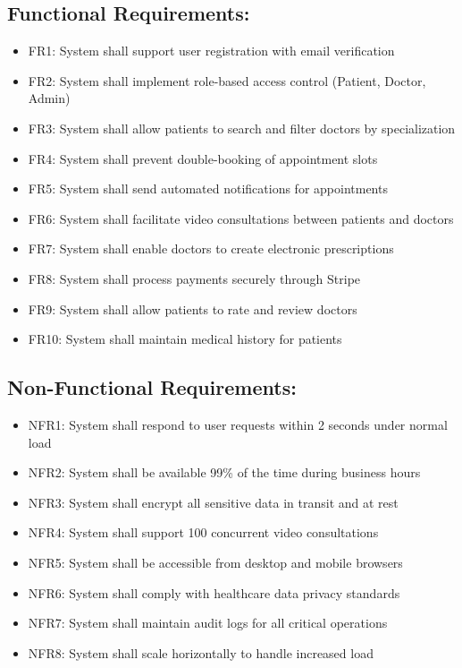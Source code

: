\documentclass[11pt,a4paper]{article}
\begin{document}
\subsection*{Functional Requirements:}
\begin{itemize}[leftmargin=*, itemsep=0.05em`']
    \item FR1: System shall support user registration with email verification
    \item FR2: System shall implement role-based access control (Patient, Doctor, Admin)
    \item FR3: System shall allow patients to search and filter doctors by specialization
    \item FR4: System shall prevent double-booking of appointment slots
    \item FR5: System shall send automated notifications for appointments
    \item FR6: System shall facilitate video consultations between patients and doctors
    \item FR7: System shall enable doctors to create electronic prescriptions
    \item FR8: System shall process payments securely through Stripe
    \item FR9: System shall allow patients to rate and review doctors
    \item FR10: System shall maintain medical history for patients
\end{itemize}

\subsection*{Non-Functional Requirements:}
\begin{itemize}[leftmargin=*, itemsep=0.05em]
    \item NFR1: System shall respond to user requests within 2 seconds under normal load
    \item NFR2: System shall be available 99\% of the time during business hours
    \item NFR3: System shall encrypt all sensitive data in transit and at rest
    \item NFR4: System shall support 100 concurrent video consultations
    \item NFR5: System shall be accessible from desktop and mobile browsers
    \item NFR6: System shall comply with healthcare data privacy standards
    \item NFR7: System shall maintain audit logs for all critical operations
    \item NFR8: System shall scale horizontally to handle increased load
\end{itemize}
\end{document}
